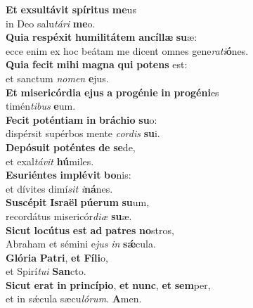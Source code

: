 \evenverse \textbf{Et} \textbf{ex}\textbf{sul}\textbf{tá}\textbf{vit} \textbf{spí}\textbf{ri}\textbf{tus} \textbf{me}us~\*\\
\evenverse in Deo salu\textit{tá}\textit{ri} \textbf{me}o.\\
\oddverse \textbf{Qui}\textbf{a} \textbf{re}\textbf{spé}\textbf{xit} \textbf{hu}\textbf{mi}\textbf{li}\textbf{tá}\textbf{tem} \textbf{an}\textbf{cíl}\textbf{læ} \textbf{su}æ:~\*\\
\oddverse ecce enim ex hoc beátam me dicent omnes gene\textit{ra}\textit{ti}\textbf{ó}nes.\\
\evenverse \textbf{Qui}\textbf{a} \textbf{fe}\textbf{cit} \textbf{mi}\textbf{hi} \textbf{ma}\textbf{gna} \textbf{qui} \textbf{po}\textbf{tens} est:~\*\\
\evenverse et sanctum \textit{no}\textit{men} \textbf{e}jus.\\
\oddverse \textbf{Et} \textbf{mi}\textbf{se}\textbf{ri}\textbf{cór}\textbf{di}\textbf{a} \textbf{e}\textbf{jus} \textbf{a} \textbf{pro}\textbf{gé}\textbf{ni}\textbf{e} \textbf{in} \textbf{pro}\textbf{gé}\textbf{ni}es~\*\\
\oddverse timén\textit{ti}\textit{bus} \textbf{e}um.\\
\evenverse \textbf{Fe}\textbf{cit} \textbf{po}\textbf{tén}\textbf{ti}\textbf{am} \textbf{in} \textbf{brá}\textbf{chi}\textbf{o} \textbf{su}o:~\*\\
\evenverse dispérsit supérbos mente \textit{cor}\textit{dis} \textbf{su}i.\\
\oddverse \textbf{De}\textbf{pó}\textbf{su}\textbf{it} \textbf{po}\textbf{tén}\textbf{tes} \textbf{de} \textbf{se}de,~\*\\
\oddverse et exal\textit{tá}\textit{vit} \textbf{hú}miles.\\
\evenverse \textbf{E}\textbf{su}\textbf{ri}\textbf{én}\textbf{tes} \textbf{im}\textbf{plé}\textbf{vit} \textbf{bo}nis:~\*\\
\evenverse et dívites dimí\textit{sit} \textit{i}\textbf{ná}nes.\\
\oddverse \textbf{Su}\textbf{scé}\textbf{pit} \textbf{Is}\textbf{ra}\textbf{ël} \textbf{pú}\textbf{e}\textbf{rum} \textbf{su}um,~\*\\
\oddverse recordátus misericór\textit{di}\textit{æ} \textbf{su}æ.\\
\evenverse \textbf{Si}\textbf{cut} \textbf{lo}\textbf{cú}\textbf{tus} \textbf{est} \textbf{ad} \textbf{pa}\textbf{tres} \textbf{no}stros,~\*\\
\evenverse Abraham et sémini e\textit{jus} \textit{in} \textbf{sǽ}cula.\\
\oddverse \textbf{Gló}\textbf{ri}\textbf{a} \textbf{Pa}\textbf{tri}, \textbf{et} \textbf{Fí}\textbf{li}o,~\*\\
\oddverse et Spirí\textit{tu}\textit{i} \textbf{San}cto.\\
\evenverse \textbf{Si}\textbf{cut} \textbf{e}\textbf{rat} \textbf{in} \textbf{prin}\textbf{cí}\textbf{pi}\textbf{o}, \textbf{et} \textbf{nunc}, \textbf{et} \textbf{sem}per,~\*\\
\evenverse et in sǽcula sæcu\textit{ló}\textit{rum}. \textbf{A}men.\\
